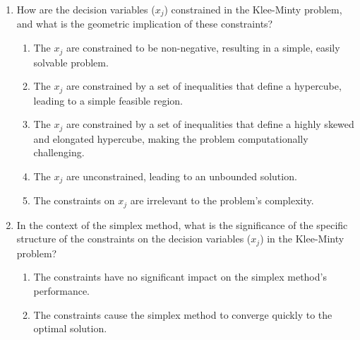 \documentclass{article}%
\begin{document}
\begin{enumerate}
\begin{enumerate}
\begin{enumerate}%
\item The objective function is to minimize a weighted sum of $x_j$, where the weights are powers of 2. The $x_j$ are the variables to be optimized.%
\item The objective function is to maximize a weighted sum of $x_j$, where the weights are powers of 2. The $x_j$ are the variables to be optimized.%
\item The objective function is to minimize a linear combination of $x_j$, with arbitrary weights. The $x_j$ represent resource constraints.%
\item The objective function is to maximize a linear combination of $x_j$, with arbitrary weights. The $x_j$ represent resource constraints.%
\item The objective function is unrelated to the decision variables $x_j$.%
\end{enumerate}%
\vspace{0.5em}%
\item How are the decision variables ($x_j$) constrained in the Klee-Minty problem, and what is the geometric implication of these constraints?%
\begin{enumerate}%
\item The $x_j$ are constrained to be non-negative, resulting in a simple, easily solvable problem.%
\item The $x_j$ are constrained by a set of inequalities that define a hypercube, leading to a simple feasible region.%
\item The $x_j$ are constrained by a set of inequalities that define a highly skewed and elongated hypercube, making the problem computationally challenging.%
\item The $x_j$ are unconstrained, leading to an unbounded solution.%
\item The constraints on $x_j$ are irrelevant to the problem's complexity.%
\end{enumerate}%
\vspace{0.5em}%
\item In the context of the simplex method, what is the significance of the specific structure of the constraints on the decision variables ($x_j$) in the Klee-Minty problem?%
\begin{enumerate}%
\item The constraints have no significant impact on the simplex method's performance.%
\item The constraints cause the simplex method to converge quickly to the optimal solution.%

\end{enumerate}
\end{enumerate}
\end{enumerate}
\end{document}
